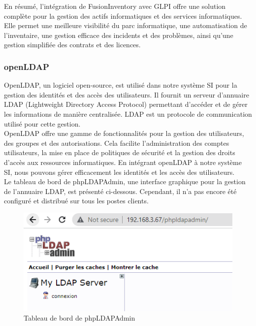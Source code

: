 En résumé, l'intégration de FusionInventory avec GLPI offre une solution complète pour la gestion des actifs informatiques et des services informatiques. Elle permet une meilleure visibilité du parc informatique, une automatisation de l'inventaire, une gestion efficace des incidents et des problèmes, ainsi qu'une gestion simplifiée des contrats et des licences. \\

\subsubsection{openLDAP}

OpenLDAP, un logiciel open-source, est utilisé dans notre système SI pour la gestion des identités et des accès des utilisateurs. Il fournit un serveur d'annuaire LDAP (Lightweight Directory Access Protocol) permettant d'accéder et de gérer les informations de manière centralisée. LDAP est un protocole de communication utilisé pour cette gestion. \\

OpenLDAP offre une gamme de fonctionnalités pour la gestion des utilisateurs, des groupes et des autorisations. Cela facilite l'administration des comptes utilisateurs, la mise en place de politiques de sécurité et la gestion des droits d'accès aux ressources informatiques. En intégrant openLDAP à notre système SI, nous pouvons gérer efficacement les identités et les accès des utilisateurs. \\

Le tableau de bord de phpLDAPAdmin, une interface graphique pour la gestion de l'annuaire LDAP, est présenté ci-dessous. Cependant, il n'a pas encore été configuré et distribué sur tous les postes clients. \\

\begin{figure}[H]
\centering
\includegraphics[width=15cm]{Images/ldapdashboard.png}
\caption{Tableau de bord de phpLDAPAdmin}
\label{fig:ldap-dashboard}
\end{figure}

